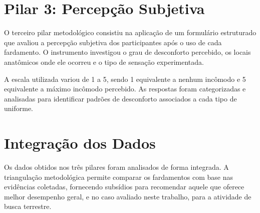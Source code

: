 \section{Pilar 3: Percepção Subjetiva}

O terceiro pilar metodológico consistiu na aplicação de um formulário estruturado que avaliou a 
percepção subjetiva dos participantes após o uso de cada fardamento. O instrumento investigou o grau 
de desconforto percebido, os locais anatômicos onde ele ocorreu e o tipo de sensação experimentada.

A escala utilizada variou de 1 a 5, sendo 1 equivalente a nenhum incômodo e 5 equivalente a máximo 
incômodo percebido. As respostas foram categorizadas e analisadas para identificar padrões de 
desconforto associados a cada tipo de uniforme.

\section{Integração dos Dados}

Os dados obtidos nos três pilares foram analisados de forma integrada. A triangulação metodológica 
permite comparar os fardamentos com base nas evidências coletadas, fornecendo subsídios 
para recomendar aquele que oferece melhor desempenho geral, e no caso avaliado neste trabalho, 
para a atividade de busca terrestre.
